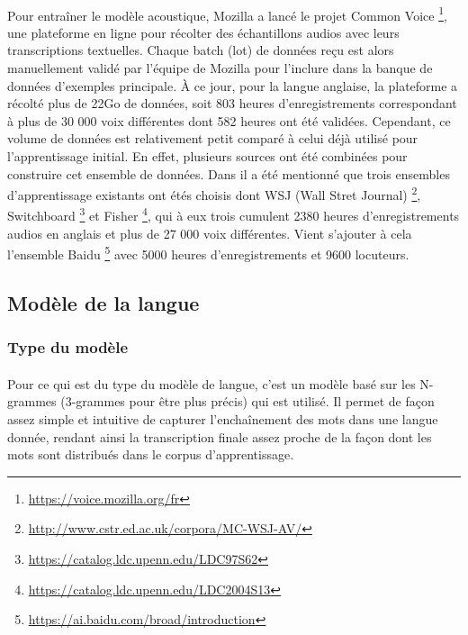 		\paragraph{}
		Pour entraîner le modèle acoustique, Mozilla a lancé le projet Common Voice \footnote{\url{https://voice.mozilla.org/fr}}, une plateforme en ligne pour récolter des échantillons audios avec leurs transcriptions textuelles. Chaque batch (lot) de données reçu est alors manuellement validé par l'équipe de Mozilla pour l'inclure dans la banque de données d'exemples principale. À ce jour, pour la langue anglaise, la plateforme a récolté plus de 22Go de données, soit 803 heures d'enregistrements correspondant à plus de 30 000 voix différentes dont 582 heures ont été validées. Cependant, ce volume de données est relativement petit comparé à celui déjà utilisé pour l'apprentissage initial. En effet, plusieurs sources ont été combinées pour construire cet ensemble de données. Dans \cite{deepspeech_paper} il a été mentionné que trois ensembles d'apprentissage existants ont étés choisis dont WSJ (Wall Stret Journal) \footnote{\url{http://www.cstr.ed.ac.uk/corpora/MC-WSJ-AV/}}, Switchboard \footnote{\url{https://catalog.ldc.upenn.edu/LDC97S62}} et Fisher \footnote{\url{https://catalog.ldc.upenn.edu/LDC2004S13}}, qui à eux trois cumulent 2380 heures d'enregistrements audios en anglais et plus de 27 000 voix différentes. Vient s'ajouter à cela l'ensemble Baidu \footnote{\url{https://ai.baidu.com/broad/introduction}} avec 5000 heures d'enregistrements et 9600 locuteurs.
		
	\subsection{Modèle de la langue}
		\subsubsection*{Type du modèle}
		\paragraph{}
		
		Pour ce qui est du type du modèle de langue, c'est un modèle basé sur les N-grammes (3-grammes pour être plus précis) qui est utilisé. Il permet de façon assez simple et intuitive de capturer l'enchaînement des mots dans une langue donnée, rendant ainsi la transcription finale assez proche de la façon dont les mots sont distribués dans le corpus d'apprentissage.
		
